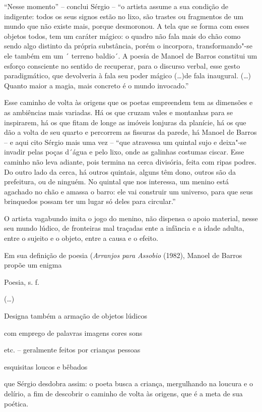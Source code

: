 ``Nesse momento'' -- conclui Sérgio -- ``o artista assume a sua condição
de indigente: todos os seus signos estão no lixo, são trastes ou
fragmentos de um mundo que não existe mais, porque desmoronou. A tela
que se forma com esses objetos todos, tem um caráter mágico: o quadro
não fala mais do chão como sendo algo distinto da própria substância,
porém o incorpora, transformando"-se ele também em um ´ terreno baldio´.
A poesia de Manoel de Barros constitui um esforço consciente no sentido
de recuperar, para o discurso verbal, esse gesto paradigmático, que
devolveria à fala seu poder mágico (\ldots{})de fala inaugural. (\ldots{}) Quanto
maior a magia, mais concreto é o mundo invocado.''

Esse caminho de volta às origens que os poetas empreendem tem as
dimensões e as ambiências mais variadas. Há os que cruzam vales e
montanhas para se inspirarem, há os que fitam de longe as imóveis
lonjuras da planície, há os que dão a volta de seu quarto e percorrem as
fissuras da parede, há Manoel de Barros -- e aqui cito Sérgio mais uma
vez -- ``que atravessa um quintal sujo e deixa"-se invadir pelas poças
d´água e pelo lixo, onde as galinhas costumas ciscar. Esse caminho não
leva adiante, pois termina na cerca divisória, feita com ripas podres.
Do outro lado da cerca, há outros quintais, alguns têm dono, outros são
da prefeitura, ou de ninguém. No quintal que nos interessa, um menino
está agachado no chão e amassa o barro: ele vai construir um universo,
para que seus brinquedos possam ter um lugar só deles para circular.''

O artista vagabundo imita o jogo do menino, não dispensa o apoio
material, nesse seu mundo lúdico, de fronteiras mal traçadas ente a
infância e a idade adulta, entre o sujeito e o objeto, entre a causa e o
efeito.

Em sua definição de poesia (\emph{Arranjos para Assobio} (1982), Manoel
de Barros propõe um enigma

{Poesia}, s. f.

(\ldots{})

Designa também a armação de objetos lúdicos

com emprego de palavras imagens cores sons

etc. -- geralmente feitos por crianças pessoas

esquisitas loucos e bêbados

que Sérgio desdobra assim: o poeta busca a criança, mergulhando na
loucura e o delírio, a fim de descobrir o caminho de volta às origens,
que é a meta de sua poética.

